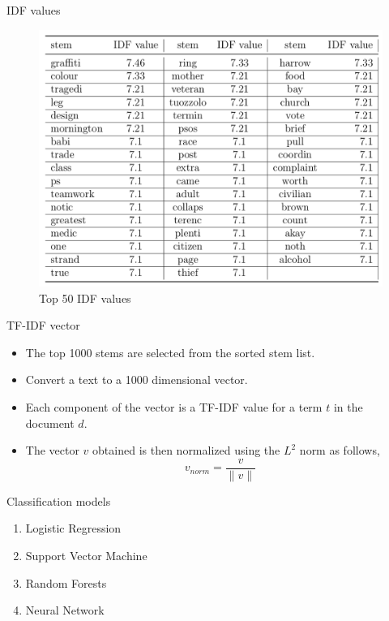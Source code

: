 \documentclass[12pt]{beamer}
\begin{document}
\begin{frame}{IDF values}
    \begin{figure}[h]
        \includegraphics[scale=0.225]{images/idf_values.png}
        \caption{Top 50 IDF values}
        \label{fig:idf_values}
    \end{figure}
\end{frame}

\begin{frame}{TF-IDF vector}
    \begin{itemize}
        \item The top 1000 stems are selected from the sorted stem list.
        \item Convert a text to a 1000 dimensional vector.
        \item Each component of the vector is a TF-IDF value for a term $t$ in the document $d$.
        \item The vector $v$ obtained is then normalized using the $L^2$ norm as follows,
        \begin{equation}
            v_{norm} = \frac{v}{\lVert v \rVert}
        \end{equation}
    \end{itemize}
\end{frame}

\begin{frame}{Classification models}
    \begin{enumerate}
        \item Logistic Regression
        \item Support Vector Machine
        \item Random Forests
        \item Neural Network
    \end{enumerate}
\end{frame}
\end{document}
